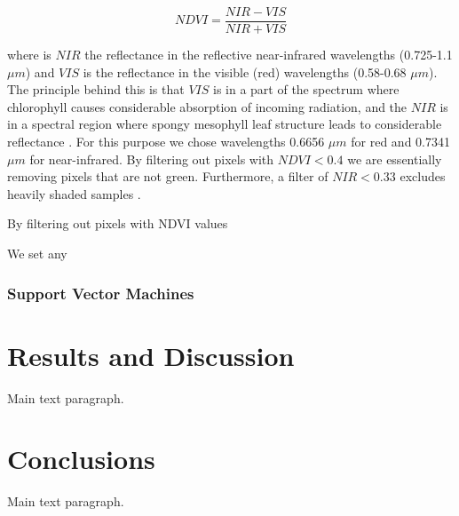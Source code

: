 \documentclass[remotesensing,article,accept,moreauthors,pdftex,12pt,a4paper]{mdpi}
\begin{document}
\begin{equation}\label{xx}
NDVI  = \frac{NIR - VIS}{NIR + VIS}
\end{equation}

where is $NIR$ the reflectance in the reflective near-infrared wavelengths (0.725-1.1 $\mu m$) and $VIS$ is the reflectance in the visible (red) wavelengths (0.58-0.68 $\mu m$). The principle behind this is that $VIS$ is in a part of the spectrum where chlorophyll causes considerable absorption of incoming radiation, and the $NIR$ is in a spectral region where spongy mesophyll leaf structure leads to considerable reflectance \cite{tucker1979red, jackson1983discrimination}. For this purpose we chose wavelengths 0.6656 $\mu m$ for red and 0.7341 $\mu m$ for near-infrared. By filtering out pixels with $NDVI < 0.4$ we are essentially removing pixels that are not green. Furthermore, a filter of $NIR < 0.33$  excludes heavily shaded samples \cite{colgan2012mapping}.

By filtering out pixels with NDVI values 

We set any

\subsubsection{Support Vector Machines}


\section{Results and Discussion}

Main text paragraph.













\section{Conclusions}

Main text paragraph.
\end{document}
